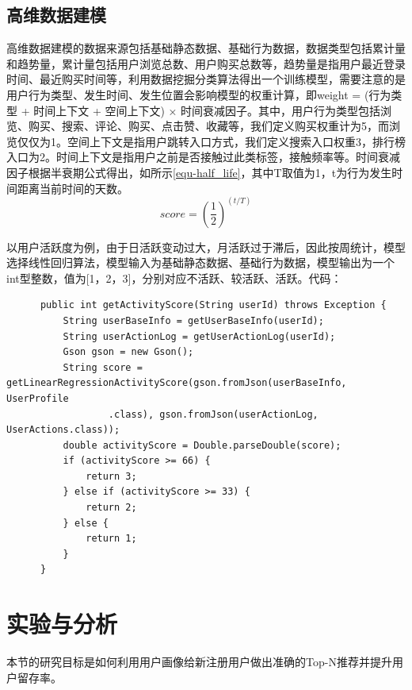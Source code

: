     \subsection{高维数据建模}
    高维数据建模的数据来源包括基础静态数据、基础行为数据，数据类型包括累计量和趋势量，累计量包括用户浏览总数、用户购买总数等，趋势量是指用户最近登录时间、最近购买时间等，利用数据挖掘分类算法得出一个训练模型，需要注意的是用户行为类型、发生时间、发生位置会影响模型的权重计算，即weight = (行为类型 + 时间上下文 + 空间上下文) × 时间衰减因子。其中，用户行为类型包括浏览、购买、搜索、评论、购买、点击赞、收藏等，我们定义购买权重计为5，而浏览仅仅为1。空间上下文是指用户跳转入口方式，我们定义搜索入口权重3，排行榜入口为2。时间上下文是指用户之前是否接触过此类标签，接触频率等。时间衰减因子根据半衰期公式得出，如所示\autoref{equ-half_life}，其中T取值为1，t为行为发生时间距离当前时间的天数。
    \begin{equation}
      score=(\frac{1}{2})^{(t/T)}
      \label{equ-half_life}
    \end{equation}

    以用户活跃度为例，由于日活跃变动过大，月活跃过于滞后，因此按周统计，模型选择线性回归算法，模型输入为基础静态数据、基础行为数据，模型输出为一个int型整数，值为[1，2，3]，分别对应不活跃、较活跃、活跃。代码：
    \begin{lstlisting}
      public int getActivityScore(String userId) throws Exception {
          String userBaseInfo = getUserBaseInfo(userId);
          String userActionLog = getUserActionLog(userId);
          Gson gson = new Gson();
          String score = getLinearRegressionActivityScore(gson.fromJson(userBaseInfo, UserProfile
                  .class), gson.fromJson(userActionLog, UserActions.class));
          double activityScore = Double.parseDouble(score);
          if (activityScore >= 66) {
              return 3;
          } else if (activityScore >= 33) {
              return 2;
          } else {
              return 1;
          }
      }
    \end{lstlisting}

    \section{实验与分析}
    本节的研究目标是如何利用用户画像给新注册用户做出准确的Top-N推荐并提升用户留存率。

